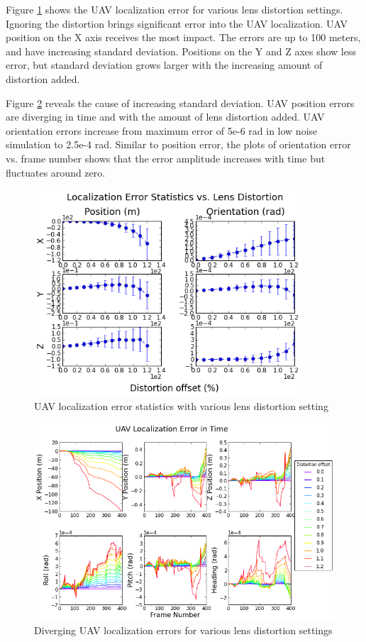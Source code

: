 Figure \ref{fig:simfig47} shows the UAV localization error for
various lens distortion settings. Ignoring the distortion brings
significant error into the UAV localization. UAV position on the X axis
receives the most impact. The errors are up to 100 meters, and have
increasing standard deviation. Positions on the Y and Z axes show less
error, but standard deviation grows larger with the increasing amount of
distortion added. 

Figure \ref{fig:simfig48} reveals the cause of increasing standard
deviation. UAV position errors are diverging in time and with the amount
of lens distortion added. UAV orientation errors increase from
maximum error of 5e-6 rad in low noise simulation to 2.5e-4
rad. Similar to position error, the plots of orientation error vs.
frame number shows that the error amplitude increases with time
but fluctuates around zero.

\begin{figure}[h]
  \centering
  \includegraphics[width=10cm,keepaspectratio=true]{./Figures/SimulationFigures/Figure47.png}
  \caption{UAV localization error statistics with various lens
    distortion setting}
  \label{fig:simfig47}
\end{figure}

\begin{figure}[h]
  \centering
  \includegraphics[width=14cm,keepaspectratio=true]{./Figures/SimulationFigures/Figure48.png}
  \caption{Diverging UAV localization errors for various lens
    distortion settings}
  \label{fig:simfig48}
\end{figure}

